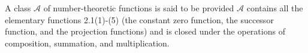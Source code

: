 A class $\mathcal{A}$ of number-theoretic functions is said to be  provided $\mathcal{A}$ contains all the elementary functions 2.1(1)-(5) (the constant zero function, the successor function, and the projection functions) and is closed under the operations of composition, summation, and multiplication.
